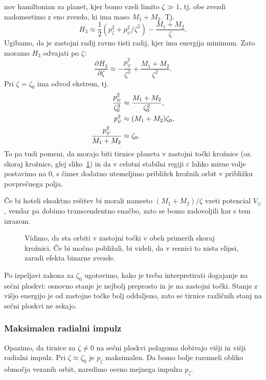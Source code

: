 \documentclass[12pt, a4paper]{article}
\newcommand{\der}[3][]{
    \ensuremath{ \frac{\partial^{#1} #2}{\partial #3^{#1}} }
}
\begin{document}
nov hamiltonian za planet, kjer bomo vzeli limito $\zeta \gg 1$, tj. obe zvezdi nadomestimo z eno zvezdo, ki
ima maso $M_1 + M_2$. Tj.
\begin{equation}
	H_3 \approx \frac{1}{2}(p_\zeta^2 + p_\psi^2/\zeta^2) - \frac{M_1 + M_2}{\zeta}.
\end{equation}
Ugibamo, da je zastojni radij ravno tisti radij, kjer ima energija minimum. Zato moramo $H_3$ odvajati po $\zeta$:
\begin{equation}
	\der{H_3}{\zeta} \approx -\frac{p_\psi^2}{\zeta^3} + \frac{M_1 + M_2}{\zeta^2}.
\end{equation}
Pri $\zeta = \zeta_0$ ima odvod ekstrem, tj.
\begin{align}
	\frac{p_\psi^2}{\zeta_0^3} &\approx \frac{M_1 + M_2}{\zeta_0^2}, \notag \\
	p_\psi^2 &\approx (M_1 + M_2)\zeta_0, \notag \\
	\frac{p_\psi^2}{M_1 + M_2} &\approx \zeta_0.
\end{align}
To pa tudi pomeni, da morajo biti tirnice planeta v zastojni to\v cki kro\v znice (oz. skoraj kro\v znice,
glej sliko~\ref{krog}) in da v celotni stabilni regiji $\varepsilon$ lahko mirne volje postavimo na 0, s \v cimer
dodatno utemeljimo pribli\v zek kro\v znih orbit v pribli\v zku povpre\v cnega polja.

\v Ce bi hoteli eksaktno re\v sitev bi morali namesto $(M_1 + M_2)/\zeta$ vzeti potencial $V_\odot$,
vendar pa dobimo transcendentno ena\v cbo, zato se bomo zadovoljili kar s tem izrazom.
\begin{figure}[H]\centering
	
	\caption{Vidimo, da sta orbiti v zastojni to\v cki v obeh primerih skoraj kro\v znici. \v Ce bi mo\v cno
		pobli\v zali, bi videli, da v resnici to nista elipsi, zaradi efekta binarne zvezde.}
	\label{krog}
\end{figure}
Po izpeljavi zakona za $\zeta_0$ ugotovimo, kako je treba interpretirati dogajanje na se\v cni ploskvi:
osnovno stanje je nejbolj preprosto in je na zastojni to\v cki. Stanje z vi\v sjo energijo je od
zastojne to\v cke bolj oddaljeno, zato se tirnice razli\v cnih stanj na se\v cni ploskvi ne sekajo.

\subsubsection{Maksimalen radialni impulz}

Opazimo, da tirnice za $\zeta \neq 0$ na se\v cni ploskvi polagoma dobivajo vi\v sji in vi\v sji radialni
impulz. Pri $\zeta \approx \zeta_0$ je $p_\zeta$ maksimalen. Da bomo bolje razumeli obliko obmo\v cja
vezanih orbit, naredimo oceno mejnega impulza $p_\zeta$.
\end{document}
